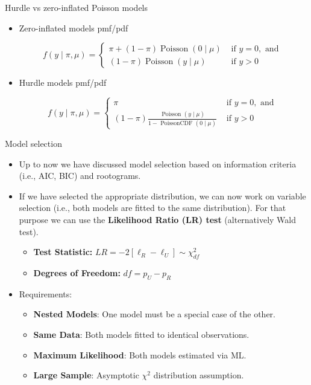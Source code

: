 \documentclass[10pt,ignorenonframetext,aspectratio=169]{beamer}
\begin{document}
\begin{frame}{Hurdle vs zero-inflated Poisson models}
\begin{itemize}
    \item Zero-inflated models pmf/pdf

$$
f\left(y \mid \pi, \mu\right)=\left\{\begin{array}{ll}\pi+(1-\pi) \operatorname{Poisson}(0 \mid \mu) & \text { if } y=0, \text { and } \\ (1-\pi)  \operatorname{Poisson}\left(y \mid \mu\right) & \text { if } y>0\end{array}\right.
$$

    \item Hurdle models pmf/pdf

$$
f(y \mid \pi, \mu)=\left\{\begin{array}{ll}\pi & \text { if } y=0, \text { and } \\ (1-\pi) \frac{\text { Poisson }(y \mid \mu)}{1-\text { PoissonCDF }(0 \mid \mu)} & \text { if } y>0\end{array}\right.
$$
\end{itemize}

\end{frame}

\begin{frame}{Model selection}
\begin{itemize}
    \item Up to now we have discussed model selection based on information criteria (i.e., AIC, BIC) and rootograms.
    \item If we have selected the appropriate distribution, we can now work on variable selection (i.e., both models are fitted to the same distribution). For that purpose we can use the \textbf{Likelihood Ratio (LR) test} (alternatively Wald test).
    \begin{itemize}
        \item \textbf{Test Statistic:} $LR = -2[\ell_R - \ell_U] \sim \chi^2_{df}$
        \item \textbf{Degrees of Freedom:} $df = p_U - p_R$
    \end{itemize}
    \item Requirements:
    \begin{itemize}
        \item \textbf{Nested Models}: One model must be a special case of the other.
        \item \textbf{Same Data}: Both models fitted to identical observations.
        \item \textbf{Maximum Likelihood}: Both models estimated via ML.
        \item \textbf{Large Sample}: Asymptotic $\chi^2$ distribution assumption.
    \end{itemize}
\end{itemize}
\end{frame}
\end{document}
